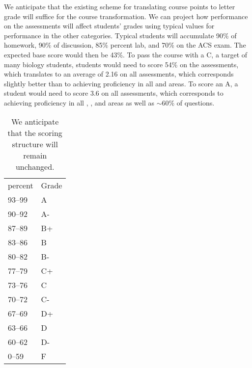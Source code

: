 \documentclass[10pt,letterpaper]{article}
\begin{document}
We anticipate that the existing scheme for translating course points to letter grade will suffice for the course transformation. We can project how performance on the assessments will affect students' grades using typical values for performance in the other categories. Typical students will accumulate 90\% of homework, 90\% of discussion, 85\% percent lab, and 70\% on the ACS exam. The expected base score would then be 43\%. To pass the course with a C, a target of many biology students, students would need to score  54\% on the assessments, which translates to an average of 2.16 on all assessments, which corresponds slightly better than to achieving proficiency in all \recall and \comprehension areas. To score an A, a student would need to score 3.6 on all assessments, which corresponds to achieving proficiency in all \recall, \comprehension, and \analysis areas as well as $\sim60$\% of \use questions. 

\begin{wraptable}{R}{0pt}
\begin{tabular}{ll}
percent&Grade\\
93--99&A\\
90--92&A-\\
87--89&B+\\
83--86&B\\
80--82&B-\\
77--79&C+\\
73--76&C\\
70--72&C-\\
67--69&D+\\
63--66&D\\
60--62&D-\\
0--59&F
\end{tabular}
\caption{\label{tbl:points}
We anticipate that the scoring structure will remain unchanged.} 
\end{wraptable}


\end{document}

